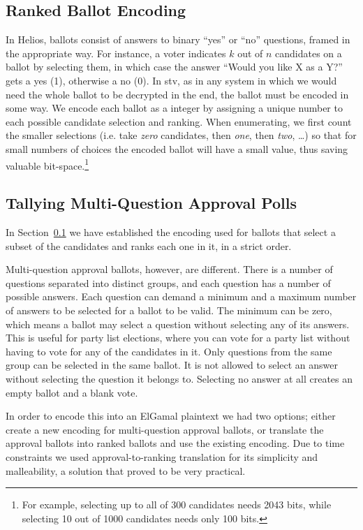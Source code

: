 \documentclass[letterpaper,10pt]{article}
\begin{document}
\subsection{Ranked Ballot Encoding}
\label{sec:ballot_encoding}
In Helios, ballots consist of answers to binary ``yes'' or ``no''
questions, framed in the appropriate way. For instance, a voter
indicates $k$ out of $n$ candidates on a ballot by selecting them, in
which case the answer ``Would you like X as a Y?'' gets a yes (1),
otherwise a no (0). In {\sc stv}, as in any system in which we would need
the whole ballot to be decrypted in the end, the ballot must be
encoded in some way. We encode each ballot as a integer by assigning a
unique number to each possible candidate selection and ranking. 
When enumerating, we first count the smaller selections (i.e. take
\textit{zero} candidates, then \textit{one}, then \textit{two},
\ldots) so that for small numbers of choices the encoded ballot will
have a small value, thus saving valuable bit-space.\footnote{ For
  example, selecting up to all of 300 candidates needs 2043 bits,
  while selecting 10 out of 1000 candidates needs only 100 bits.}

\subsection{Tallying Multi-Question Approval Polls}
\label{sec:approval_counting}
In Section~\ref{sec:ballot_encoding} we have established the encoding
used for ballots that select a subset of the candidates and ranks each
one in it, in a strict order.

Multi-question approval ballots, however, are different.
There is a number of questions separated into distinct groups,
and each question has a number of possible answers.
Each question can demand a minimum and a maximum number of answers
to be selected for a ballot to be valid.
The minimum can be zero, which means a ballot may select a question
without selecting any of its answers.
This is useful for party list elections, where you can vote for
a party list without having to vote for any of the candidates in it.
Only questions from the same group can be selected in the same ballot.
It is not allowed to select an answer without selecting the question
it belongs to.
Selecting no answer at all creates an empty ballot and a blank vote.

In order to encode this into an ElGamal plaintext we had two options;
either create a new encoding for multi-question approval ballots,
or translate the approval ballots into ranked ballots and use the
existing encoding.
Due to time constraints we used approval-to-ranking translation for
its simplicity and malleability, a solution that proved to be very
practical.
\end{document}
